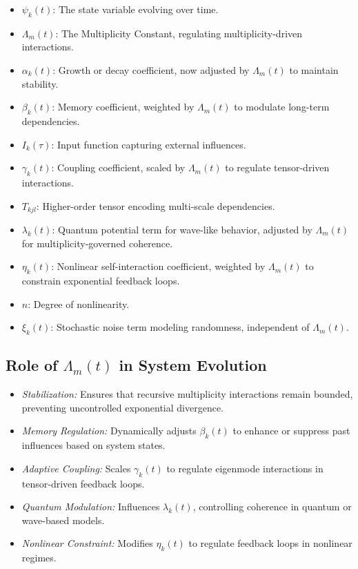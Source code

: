 \documentclass{article}
\theoremstyle{plain}
\begin{document}
\begin{itemize}
    \item \( \psi_k(t) \): The state variable evolving over time.
    \item \( \Lambda_m(t) \): The Multiplicity Constant, regulating multiplicity-driven interactions.
    \item \( \alpha_k(t) \): Growth or decay coefficient, now adjusted by \( \Lambda_m(t) \) to maintain stability.
    \item \( \beta_k(t) \): Memory coefficient, weighted by \( \Lambda_m(t) \) to modulate long-term dependencies.
    \item \( I_k(\tau) \): Input function capturing external influences.
    \item \( \gamma_k(t) \): Coupling coefficient, scaled by \( \Lambda_m(t) \) to regulate tensor-driven interactions.
    \item \( T_{kjl} \): Higher-order tensor encoding multi-scale dependencies.
    \item \( \lambda_k(t) \): Quantum potential term for wave-like behavior, adjusted by \( \Lambda_m(t) \) for multiplicity-governed coherence.
    \item \( \eta_k(t) \): Nonlinear self-interaction coefficient, weighted by \( \Lambda_m(t) \) to constrain exponential feedback loops.
    \item \( n \): Degree of nonlinearity.
    \item \( \xi_k(t) \): Stochastic noise term modeling randomness, independent of \( \Lambda_m(t) \).
\end{itemize}

\subsection{Role of \( \Lambda_m(t) \) in System Evolution}

\begin{itemize}
    \item \textit{Stabilization:} Ensures that recursive multiplicity interactions remain bounded, preventing uncontrolled exponential divergence.
    \item \textit{Memory Regulation:} Dynamically adjusts \( \beta_k(t) \) to enhance or suppress past influences based on system states.
    \item \textit{Adaptive Coupling:} Scales \( \gamma_k(t) \) to regulate eigenmode interactions in tensor-driven feedback loops.
    \item \textit{Quantum Modulation:} Influences \( \lambda_k(t) \), controlling coherence in quantum or wave-based models.
    \item \textit{Nonlinear Constraint:} Modifies \( \eta_k(t) \) to regulate feedback loops in nonlinear regimes.
\end{itemize}
\end{document}
